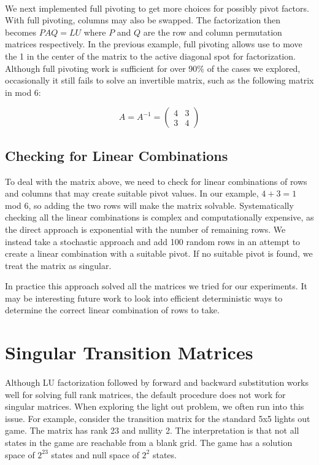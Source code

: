 \documentclass[11pt]{article}
\begin{document}
\paragraph{} We next implemented full pivoting to get more choices for possibly pivot factors.  With full pivoting, columns may also be swapped.  The factorization then becomes $PAQ = LU$ where $P$ and $Q$ are the row and column permutation matrices respectively.  In the previous example, full pivoting allows use to move the 1 in the center of the matrix to the active diagonal spot for factorization.  Although full pivoting work is sufficient for over 90\% of the cases we explored, occasionally it still fails to solve an invertible matrix, such as the following matrix in mod 6:

\[
A = A^{-1} =
\begin{pmatrix}
4 & 3 \\
3 & 4
\end{pmatrix}
\]

\subsection*{Checking for Linear Combinations}
To deal with the matrix above, we need to check for linear combinations of rows and columns that may create suitable pivot values.  In our example, $4 + 3 = 1$ mod 6, so adding the two rows will make the matrix solvable.  Systematically checking all the linear combinations is complex and computationally expensive, as the direct approach is exponential with the number of remaining rows.  We instead take a stochastic approach and add 100 random rows in an attempt to create a linear combination with a suitable pivot.  If no suitable pivot is found, we treat the matrix as singular.

In practice this approach solved all the matrices we tried for our experiments.  It may be interesting future work to look into efficient deterministic ways to determine the correct linear combination of rows to take.


\section*{Singular Transition Matrices}
\paragraph{} Although LU factorization followed by forward and backward substitution works well for solving full rank matrices, the default procedure does not work for singular matrices.  When exploring the light out problem, we often run into this issue.  For example, consider the transition matrix for the standard 5x5 lights out game.  The matrix has rank 23 and nullity 2.  The interpretation is that not all states in the game are reachable from a blank grid.  The game has a solution space of $2^{23}$ states and null space of $2^2$ states.
\end{document}
